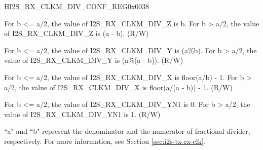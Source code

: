 \begin{register}{H}{I2S\_RX\_CLKM\_DIV\_CONF\_REG}{0x0038}\label{regdesc:I2SRXCLKMDIVCONFREG}
%
%
%
%
%
\regnewline%
\begin{regdesc}\begin{reglist}
\label{fielddesc:I2SRXCLKMDIVZ}\item [I2S\_RX\_CLKM\_DIV\_Z] For b <= a/2, the value of I2S\_RX\_CLKM\_DIV\_Z is b. For b > a/2, the value of I2S\_RX\_CLKM\_DIV\_Z is (a - b). (R/W)
\label{fielddesc:I2SRXCLKMDIVY}\item [I2S\_RX\_CLKM\_DIV\_Y] For b <= a/2, the value of I2S\_RX\_CLKM\_DIV\_Y is (a\%b). For b > a/2, the value of I2S\_RX\_CLKM\_DIV\_Y is (a\%(a - b)). (R/W)
\label{fielddesc:I2SRXCLKMDIVX}\item [I2S\_RX\_CLKM\_DIV\_X] For b <= a/2, the value of I2S\_RX\_CLKM\_DIV\_X is floor(a/b) - 1. For b > a/2, the value of I2S\_RX\_CLKM\_DIV\_X is floor(a/(a - b)) - 1. (R/W)
\label{fielddesc:I2SRXCLKMDIVYN1}\item [I2S\_RX\_CLKM\_DIV\_YN1] For b <= a/2, the value of I2S\_RX\_CLKM\_DIV\_YN1 is 0. For b > a/2, the value of I2S\_RX\_CLKM\_DIV\_YN1 is 1. (R/W)
\end{reglist}\end{regdesc}
\vspace{-2em}
\begin{tiplisting}
``a" and ``b" represent the denominator and the numerator of fractional divider, respectively. For more information, see Section \ref{sec:i2s-tx-rx-clk}.
\end{tiplisting}

\end{register}


